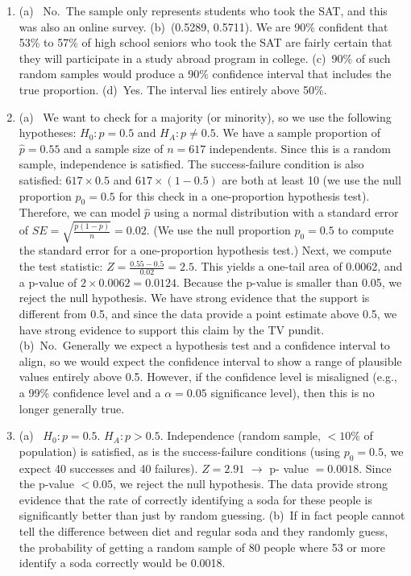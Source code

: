 \documentclass[
  10pt,
  openany]{book}
\begin{document}
\begin{enumerate}
  \addtocounter{enumi}{1}
\item
  (a) ~No.~The sample only represents students who took the SAT, and this was also an online survey. (b)~(0.5289, 0.5711). We are 90\% confident that 53\% to 57\% of high school seniors who took the SAT are fairly certain that they will participate in a study abroad program in college. (c)~90\% of such random samples would produce a 90\% confidence interval that includes the true proportion. (d)~Yes. The interval lies entirely above 50\%.

  \addtocounter{enumi}{1}
\item
  (a) ~We want to check for a majority (or minority), so we use the following hypotheses: \(H_0: p = 0.5\) and \(H_A: p \neq 0.5\). We have a sample proportion of \(\hat{p} = 0.55\) and a sample size of \(n = 617\) independents. Since this is a random sample, independence is satisfied. The success-failure condition is also satisfied: \(617 \times 0.5\) and \(617 \times (1 - 0.5)\) are both at least 10 (we use the null proportion \(p_0 = 0.5\) for this check in a one-proportion hypothesis test). Therefore, we can model \(\hat{p}\) using a normal distribution with a standard error of \(SE = \sqrt{\frac{p(1 - p)}{n}} = 0.02\). (We use the null proportion \(p_0 = 0.5\) to compute the standard error for a one-proportion hypothesis test.) Next, we compute the test statistic: \(Z = \frac{0.55 - 0.5}{0.02} = 2.5.\) This yields a one-tail area of 0.0062, and a p-value of \(2 \times 0.0062 = 0.0124.\) Because the p-value is smaller than 0.05, we reject the null hypothesis. We have strong evidence that the support is different from 0.5, and since the data provide a point estimate above 0.5, we have strong evidence to support this claim by the TV pundit. (b)~No.~Generally we expect a hypothesis test and a confidence interval to align, so we would expect the confidence interval to show a range of plausible values entirely above 0.5. However, if the confidence level is misaligned (e.g., a 99\% confidence level and a \(\alpha = 0.05\) significance level), then this is no longer generally true.

  \addtocounter{enumi}{1}
\item
  (a) ~\(H_0: p = 0.5\). \(H_A: p > 0.5\). Independence (random sample, \(<10\%\) of population) is satisfied, as is the success-failure conditions (using \(p_0 = 0.5\), we expect 40 successes and 40 failures). \(Z = 2.91\) \(\to\) p- value \(= 0.0018\). Since the p-value \(< 0.05\), we reject the null hypothesis. The data provide strong evidence that the rate of correctly identifying a soda for these people is significantly better than just by random guessing. (b)~If in fact people cannot tell the difference between diet and regular soda and they randomly guess, the probability of getting a random sample of 80 people where 53 or more identify a soda correctly would be 0.0018.


\end{enumerate}
\end{document}
